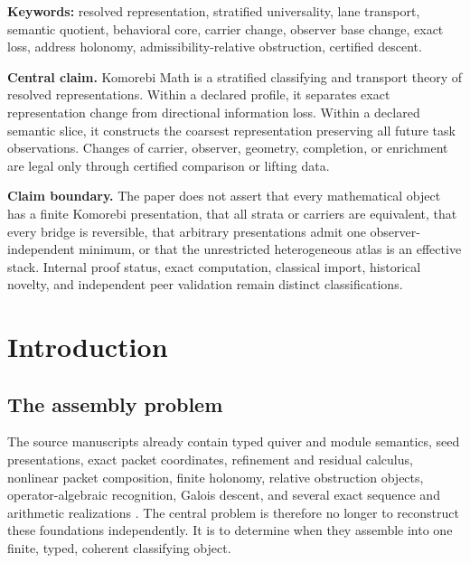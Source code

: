 \documentclass[11pt]{article}
\theoremstyle{definition}
\theoremstyle{remark}
\begin{document}
\begin{center}
\small\textbf{Keywords:} resolved representation, stratified universality, lane transport, semantic quotient, behavioral core, carrier change, observer base change, exact loss, address holonomy, admissibility-relative obstruction, certified descent.
\end{center}

\begin{claimbox}
\textbf{Central claim.}
Komorebi Math is a stratified classifying and transport theory of resolved representations. Within a declared profile, it separates exact representation change from directional information loss. Within a declared semantic slice, it constructs the coarsest representation preserving all future task observations. Changes of carrier, observer, geometry, completion, or enrichment are legal only through certified comparison or lifting data.
\end{claimbox}

\begin{boundarybox}
\textbf{Claim boundary.}
The paper does not assert that every mathematical object has a finite Komorebi presentation, that all strata or carriers are equivalent, that every bridge is reversible, that arbitrary presentations admit one observer-independent minimum, or that the unrestricted heterogeneous atlas is an effective stack. Internal proof status, exact computation, classical import, historical novelty, and independent peer validation remain distinct classifications.
\end{boundarybox}

\tableofcontents
\clearpage
{}

\section{Introduction}

\subsection{The assembly problem}

The source manuscripts already contain typed quiver and module semantics, seed presentations, exact packet coordinates, refinement and residual calculus, nonlinear packet composition, finite holonomy, relative obstruction objects, operator-algebraic recognition, Galois descent, and several exact sequence and arithmetic realizations \cite{P1,RT,P3,GAL,SEQ}. The central problem is therefore no longer to reconstruct these foundations independently. It is to determine when they assemble into one finite, typed, coherent classifying object.
\end{document}
